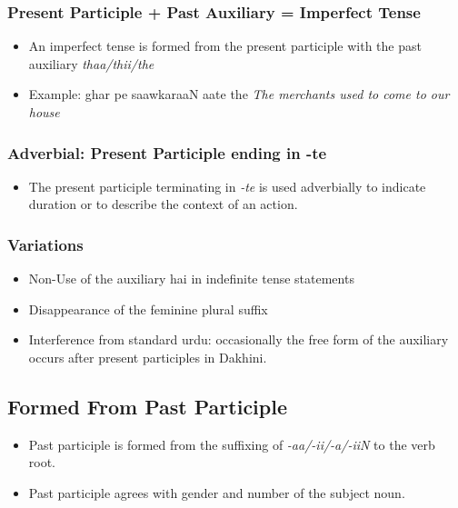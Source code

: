 \documentclass[a4paper]{article}
\begin{document}
\subsubsection{Present Participle + Past Auxiliary = Imperfect Tense}

\begin{itemize}
\item
An imperfect tense is formed from the present participle with the past auxiliary \emph{thaa/thii/the}
\item
Example: ghar pe saawkaraaN aate the \textit{The merchants used to come to our house}
\end{itemize}

\subsubsection{Adverbial: Present Participle ending in -te}

\begin{itemize}
\item
The present participle terminating in \emph{-te} is used adverbially to indicate duration or to describe the context of an action.
\end{itemize}


\subsubsection{Variations}

\begin{itemize}
\item
Non-Use of the auxiliary hai in indefinite tense statements
\item
Disappearance of the feminine plural suffix
\item
Interference from standard urdu: occasionally the free form of the auxiliary occurs after present participles in Dakhini.
\end{itemize}

\subsection{Formed From Past Participle}

\begin{itemize}
\item
Past participle is formed from the suffixing of \emph{-aa/-ii/-a/-iiN} to the verb root.
\item
Past participle agrees with gender and number of the subject noun.
\end{itemize}
\end{document}
